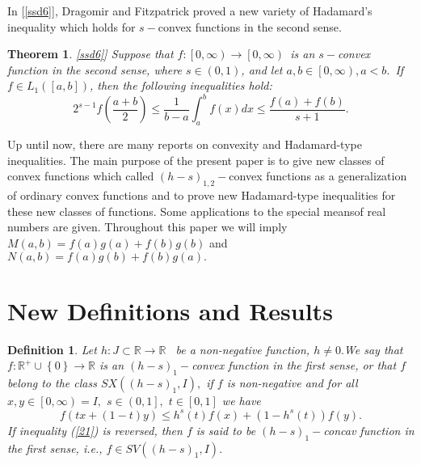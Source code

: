 \documentclass{amsart}
\newtheorem{theorem}{Theorem}
\theoremstyle{plain}
\newtheorem{definition}{Definition}
\numberwithin{equation}{section}
\begin{document}
In [\ref{ssd6}], Dragomir and Fitzpatrick proved a new variety of Hadamard's
inequality which holds for $s-$convex functions in the second sense.\bigskip

\begin{theorem}
\lbrack \ref{ssd6}] \textit{Suppose that }$f:\left[ 0,\infty \right)
\rightarrow \left[ 0,\infty \right) $\textit{\ is an }$s-$\textit{convex
function in the second sense, where }$s\in \left( 0,1\right) $\textit{, and
let }$a,b\in \left[ 0,\infty \right) ,a<b.$\textit{\ If }$f\in L_{1}\left( \left[ a,b\right] \right) $\textit{, then the following inequalities hold:}\begin{equation}
2^{s-1}f\left( \frac{a+b}{2}\right) \leq \frac{1}{b-a}\int_{a}^{b}f\left(
x\right) dx\leq \frac{f\left( a\right) +f\left( b\right) }{s+1}.  \label{109}
\end{equation}
\end{theorem}

Up until now, there are many reports on convexity and Hadamard-type
inequalities. The main purpose of the present paper is to give new classes
of convex functions which called $\left( h-s\right) _{1,2}-$convex functions
as a generalization of ordinary convex functions and to prove new
Hadamard-type inequalities for these new classes of functions. Some
applications to the special meansof real numbers are given. Throughout this
paper we will imply $M(a,b)=f(a)g(a)+f(b)g(b)$ and $N(a,b)=f(a)g(b)+f(b)g(a). $\bigskip

\section{New Definitions and Results}

\begin{definition}
Let $h:J\subset 
\mathbb{R}
\rightarrow 
\mathbb{R}
$ \ be a non-negative function, $h\neq 0.$We say that $f:\mathbb{R}
^{+}\cup \left\{ 0\right\} \rightarrow 
\mathbb{R}
$ is an $\left( h-s\right) _{1}-$convex function in the first sense, or that 
$f$ belong to the class $SX(\left( h-s\right) _{1},I),$ if $f$ is
non-negative and for all $x,y\in \left[ 0,\infty \right) =I,$ $s\in \left(
0,1\right] ,$ $t\in \left[ 0,1\right] $ we have\begin{equation}
f(tx+(1-t)y)\leq h^{s}(t)f(x)+(1-h^{s}(t))f(y).  \label{21}
\end{equation}\bigskip If inequality (\ref{21}) is reversed, then $f$ is said to be $\left( h-s\right) _{1}-$concav function in the first sense, i.e., $f\in
SV(\left( h-s\right) _{1},I).$\bigskip
\end{definition}
\end{document}
